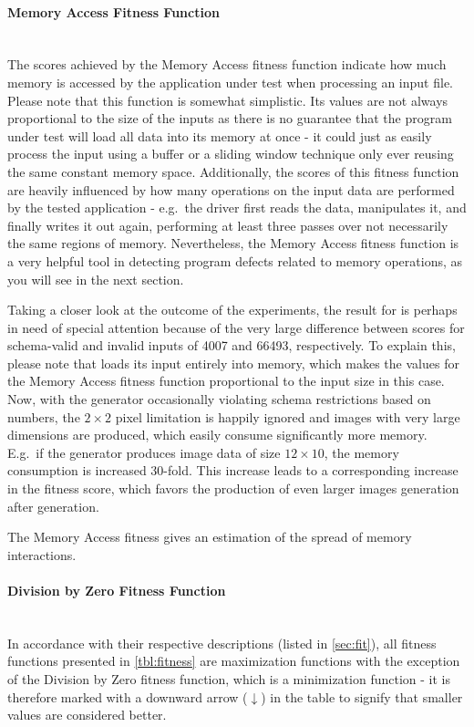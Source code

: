 \paragraph{Memory Access Fitness Function} ~\\
The scores achieved by the Memory Access fitness function indicate how much memory is accessed by the
application under test when processing an input file. Please note that this function is somewhat simplistic.
Its values are not always proportional to the size of the inputs as there is no guarantee that the program
under test will load all data into its memory at once - it could just as easily process the input using a
buffer or a sliding window technique only ever reusing the same constant memory space.
Additionally, the scores of this fitness function are heavily influenced by how many operations on the input
data are performed by the tested application - e.g.\ the \libpng driver first reads the data, manipulates
it, and finally writes it out again, performing at least three passes over not necessarily the same regions of
memory. Nevertheless, the Memory Access fitness function is a very helpful tool in detecting program defects
related to memory operations, as you will see in the next section. 

Taking a closer look at the outcome of the experiments, the result for \libpng is perhaps in need of special
attention because of the very large difference between scores for schema-valid and invalid inputs of 4007 and
66493, respectively. To explain this, please note that \libpng loads its input entirely into memory, which
makes the values for the Memory Access fitness function proportional to the input size in this case. Now, with
the generator occasionally violating schema restrictions based on numbers, the $2\times 2$ pixel limitation is
happily ignored and images with very large dimensions are produced, which easily consume significantly more
memory. E.g.\ if the generator produces image data of size $12 \times 10$, the memory consumption is increased
30-fold. This increase leads to a corresponding increase in the fitness score, which favors the production
of even larger images generation after generation.

\begin{mdframed}
\centering
The Memory Access fitness gives an estimation of the spread of memory interactions.
\end{mdframed}

\paragraph{Division by Zero Fitness Function} ~\\
In accordance with their respective descriptions (listed in \cref{sec:fit}), all fitness functions
presented in \cref{tbl:fitness} are maximization functions with the exception of the Division by Zero fitness
function, which is a minimization function - it is therefore marked with a downward arrow ($\downarrow$) in the
table to signify that smaller values are considered better.

